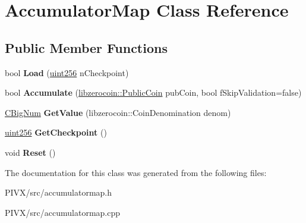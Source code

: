 \hypertarget{class_accumulator_map}{}\section{Accumulator\+Map Class Reference}
\label{class_accumulator_map}
\subsection*{Public Member Functions}
\begin{DoxyCompactItemize}
\item 
\mbox{\label{class_accumulator_map_a555952cd361c42cc880d4e6dc612f5de}} 
bool {\bfseries Load} (\mbox{\hyperlink{classuint256}{uint256}} n\+Checkpoint)
\item 
\mbox{\label{class_accumulator_map_a4367ebb7451f2140eaf7c38de1d07f94}} 
bool {\bfseries Accumulate} (\mbox{\hyperlink{classlibzerocoin_1_1_public_coin}{libzerocoin\+::\+Public\+Coin}} pub\+Coin, bool f\+Skip\+Validation=false)
\item 
\mbox{\label{class_accumulator_map_a51085c95a5d7162e0f834c13d3b42acc}} 
\mbox{\hyperlink{class_c_big_num}{C\+Big\+Num}} {\bfseries Get\+Value} (libzerocoin\+::\+Coin\+Denomination denom)
\item 
\mbox{\label{class_accumulator_map_ad5fc3075ad1492f352266a287d8282ef}} 
\mbox{\hyperlink{classuint256}{uint256}} {\bfseries Get\+Checkpoint} ()
\item 
\mbox{\label{class_accumulator_map_a82bbe7e99ebf4d39bf40450392b8d772}} 
void {\bfseries Reset} ()
\end{DoxyCompactItemize}


The documentation for this class was generated from the following files\+:\begin{DoxyCompactItemize}
\item 
P\+I\+V\+X/src/accumulatormap.\+h\item 
P\+I\+V\+X/src/accumulatormap.\+cpp\end{DoxyCompactItemize}

